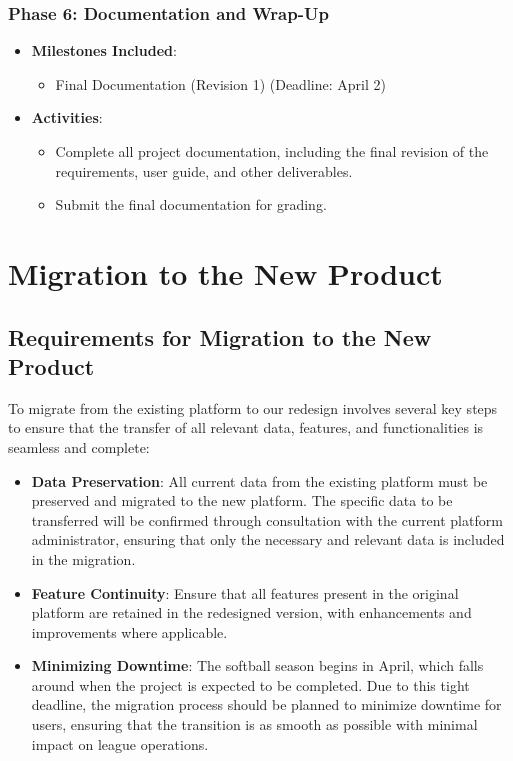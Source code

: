 \documentclass[12pt]{article}
\begin{document}
\subsubsection*{Phase 6: Documentation and Wrap-Up}
\begin{itemize}
    \item \textbf{Milestones Included}:
    \begin{itemize}
        \item Final Documentation (Revision 1) (Deadline: April 2)
    \end{itemize}
    \item \textbf{Activities}:
    \begin{itemize}
        \item Complete all project documentation, including the final revision of the requirements, user guide, and other deliverables.
        \item Submit the final documentation for grading.
    \end{itemize}
\end{itemize}

\section{Migration to the New Product}
\subsection{Requirements for Migration to the New Product}
To migrate from the existing platform to our redesign involves several key steps to ensure that the transfer of all relevant data, features, and functionalities is seamless and complete:

\begin{itemize}
    \item \textbf{Data Preservation}: All current data from the existing platform must be preserved and migrated to the new platform. The specific data to be transferred will be confirmed through consultation with the current platform administrator, ensuring that only the necessary and relevant data is included in the migration.
    \item \textbf{Feature Continuity}: Ensure that all features present in the original platform are retained in the redesigned version, with enhancements and improvements where applicable.
    \item \textbf{Minimizing Downtime}: The softball season begins in April, which falls around when the project is expected to be completed. Due to this tight deadline, the migration process should be planned to minimize downtime for users, ensuring that the transition is as smooth as possible with minimal impact on league operations.
\end{itemize}
\end{document}
